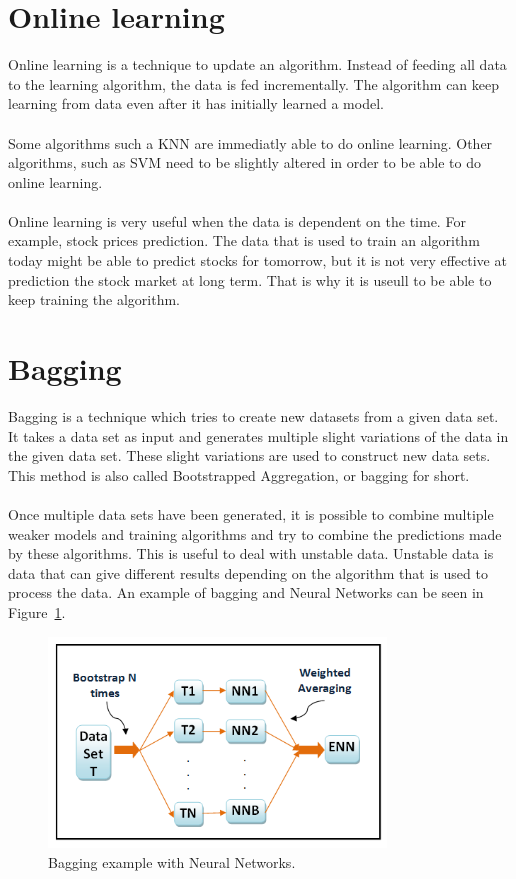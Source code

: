 \section{Online learning}
Online learning is a technique to update an algorithm. Instead of feeding all data to the learning algorithm, the data is fed incrementally. The algorithm can keep learning from data even after it has initially learned a model. \\\\
Some algorithms such a KNN are immediatly able to do online learning. Other algorithms, such as SVM need to be slightly altered in order to be able to do online learning. \\\\
Online learning is very useful when the data is dependent on the time. For example, stock prices prediction. The data that is used to train an algorithm today might be able to predict stocks for tomorrow, but it is not very effective at prediction the stock market at long term. That is why it is useull to be able to keep training the algorithm. \cite{onlineLearning}

\section{Bagging}
Bagging is a technique which tries to create new datasets from a given data set. It takes a data set as input and generates multiple slight variations of the data in the given data set. These slight variations are used to construct new data sets. This method is also called Bootstrapped Aggregation, or bagging for short. \\
\\
Once multiple data sets have been generated, it is possible to combine multiple weaker models and training algorithms and try to combine the predictions made by these algorithms. This is useful to deal with unstable data. Unstable data is data that can give different results depending on the algorithm that is used to process the data. An example of bagging and Neural Networks can be seen in Figure~\ref{fig:baggingExample}. \cite{mlcat}

\begin{figure}[H]
\centering
\includegraphics[width=0.8\textwidth]{Figures/bagging}
\decoRule
\caption[Bagging example with Neural Networks]{Bagging example with Neural Networks. \cite{baggingExample}}
\label{fig:baggingExample}
\end{figure}